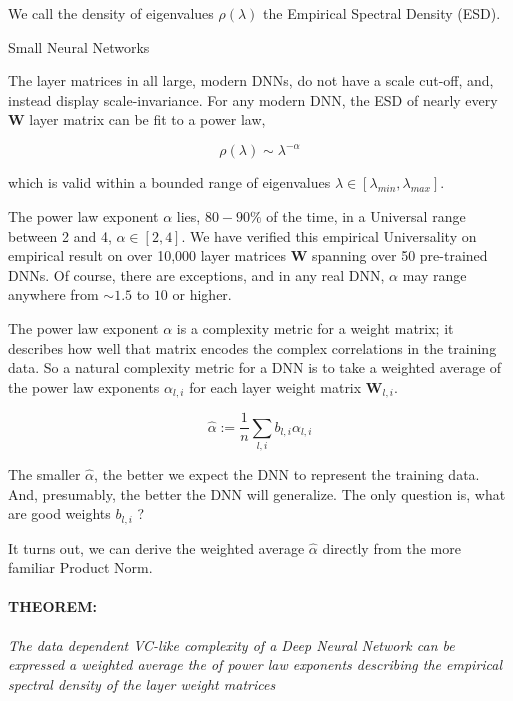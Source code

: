 We call the density of eigenvalues $\rho(\lambda)$ the Empirical Spectral Density (ESD).  

Small Neural Networks 

The layer matrices in all large, modern DNNs, do not have a scale cut-off, and, instead display scale-invariance.  
For any modern DNN, the ESD of nearly every \ $\mathbf{W}$ layer matrix can be fit to a power law,

$$\rho(\lambda)\sim\lambda^{-\alpha}$$

which is valid within a bounded range of eigenvalues $\lambda\in[\lambda_{min},\lambda_{max}]$.

The power law exponent $\alpha$ lies, $80-90\%$ of the time, in a Universal range between 2 and 4, $\alpha\in[2,4]$.
We have verified this empirical Universality on empirical result on over 10,000 layer matrices $\mathbf{W}$ spanning over 50 pre-trained DNNs.
Of course, there are exceptions, and in any real DNN,  $\alpha$ may range anywhere from $\sim1.5$ to $10$ or higher.  

The power law exponent $\alpha$ is a complexity metric for a weight matrix; it describes how well that matrix encodes the complex correlations in the training data.
So a natural complexity metric for a DNN is to take a weighted average of the power law exponents $\alpha_{l,i}$ for each layer weight matrix $\mathbf{W}_{l,i}$.

$$\hat{\alpha}:=\dfrac{1}{n}\sum_{l,i}b_{l,i}\alpha_{l,i}$$

The smaller $\hat{\alpha}$, the better we expect the DNN to represent the training data. And, presumably, the better the DNN will generalize.
The only question is, what are good weights $b_{l,i}$ ?

It turns out, we can derive the weighted average $\hat{\alpha}$ directly from the more familiar Product Norm.



\paragraph{THEOREM:} \emph{The data dependent VC-like complexity of a Deep Neural Network can be expressed a weighted average the of power law exponents describing the empirical spectral density of the layer weight matrices}

